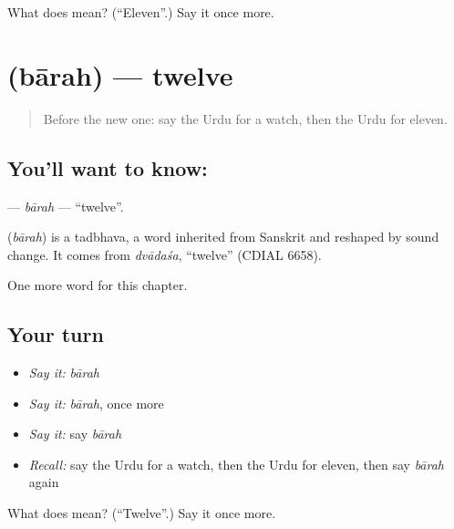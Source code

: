 \begin{tcolorbox}[breakable,colback=teal!4,colframe=teal!35!black,title={Before you move on}]
What does  mean? (\textquotedblleft{}Eleven\textquotedblright{}.) Say it once more.
\end{tcolorbox}
\section[\texorpdfstring{\ur{بارہ} (bārah)}{بارہ (bārah)}]{ (bārah) — twelve}

\label{lesson:UR-C83-barah}



\begin{quote}
Before the new one: say the Urdu for a watch, then the Urdu for eleven.
\end{quote}

\subsection*{You'll want to know: }
\textbf{} — \emph{bārah} — \textquotedblleft{}twelve\textquotedblright{}.

\begin{cousinweb}
\textbf{} (\emph{bārah}) is a tadbhava, a word inherited from Sanskrit and reshaped by sound change. It comes from \emph{dvādaśa}, \textquotedblleft{}twelve\textquotedblright{} (CDIAL 6658).
\end{cousinweb}

\begin{grammarlens}[title={What you've built}]
One more word for this chapter.
\end{grammarlens}

\subsection*{Your turn}
\begin{itemize}
\raggedright
  \item \emph{Say it:} \emph{bārah}
  \item \emph{Say it:} \emph{bārah}, once more
  \item \emph{Say it:} say \emph{bārah}
  \item \emph{Recall:} say the Urdu for a watch, then the Urdu for eleven, then say \emph{bārah} again
\end{itemize}

\begin{tcolorbox}[breakable,colback=teal!4,colframe=teal!35!black,title={Before you move on}]
What does  mean? (\textquotedblleft{}Twelve\textquotedblright{}.) Say it once more.
\end{tcolorbox}
